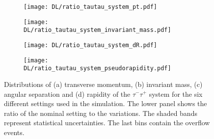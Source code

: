 \begin{figure}[H]
    \centering
    \begin{subfigure}{0.49\textwidth}
        \centering
        \texttt{[image: DL/ratio\_tautau\_system\_pt.pdf]}
        \caption{}
        \label{app:subfig:pt(tt)_DL}
    \end{subfigure}
    \begin{subfigure}{0.49\textwidth}
        \centering
        \texttt{[image: DL/ratio\_tautau\_system\_invariant\_mass.pdf]}
        \caption{}
        \label{app:subfig:m(tt)_DL}
    \end{subfigure}

    \vspace{0.2cm}
    
    \begin{subfigure}{0.49\textwidth}
        \centering
        \texttt{[image: DL/ratio\_tautau\_system\_dR.pdf]}
        \caption{}
        \label{app:subfig:dR(tt)_DL}
    \end{subfigure}
    \begin{subfigure}{0.49\textwidth}
        \centering
        \texttt{[image: DL/ratio\_tautau\_system\_pseudorapidity.pdf]}
        \caption{}
        \label{app:subfig:eta(tt)_DL}
    \end{subfigure}
    \caption{Distributions of (a) transverse momentum, (b) invariant mass,  (c) angular separation and (d) rapidity of the $\tau^-\tau^+$ system for the six different settings used in the simulation. The lower panel shows the ratio of the nominal setting to the variations. The shaded bands represent statistical uncertainties. The last bins contain the overflow events.}
    \label{app:fig:tautau_DL}
\end{figure}


